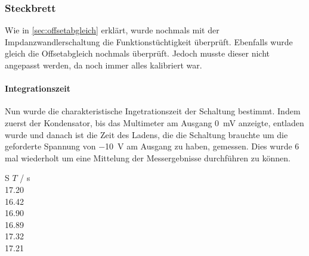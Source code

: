 \documentclass[12pt,english,ngerman]{scrartcl}
\begin{document}
\subsubsection{Steckbrett}
Wie in \autoref{sec:offsetabgleich} erklärt, wurde nochmals mit der
Impdanzwandlerschaltung die Funktionstüchtigkeit überprüft. Ebenfalls wurde
gleich die Offsetabgleich nochmals überprüft. Jedoch musste dieser nicht
angepasst werden, da noch immer alles kalibriert war.




\paragraph{Integrationszeit}
Nun wurde die charakteristische Ingetrationszeit der Schaltung bestimmt. Indem
zuerst der Kondensator, bis das Multimeter am Ausgang \SI{0}{\mV} anzeigte,
entladen wurde und danach ist die Zeit des Ladens, die die Schaltung brauchte
um die geforderte Spannung von \SI{-10}{\volt} am Ausgang zu haben, gemessen.
Dies wurde 6 mal wiederholt um eine Mittelung der Messergebnisse durchführen zu
können.

\begin{table}[H]
  \caption{Messungen der Integrationszeit der realen Integratorschaltung aus
  \autoref{fig:sim_integrator_schaltung}, wobei $T$ die Ladezeit bis am Ausgang
  \SI{-10}{\volt} anliegt. Bei einem Ladespannung \SI{91.8}{\milli\volt}, einem
  Widerstand von \SI{21.9}{\kilo\ohm} und einer Kapazität von
  \SI{6.8}{\micro\farad} }
  \label{tab:messungen_integration}
  \centering
  \begin{tabular}[c]{S}
    {$T$ / \si{\second}} \\
    17.20 \\
    16.42 \\
    16.90 \\
    16.89 \\
    17.32 \\
    17.21 \\
  \end{tabular}
\end{table}
\end{document}
